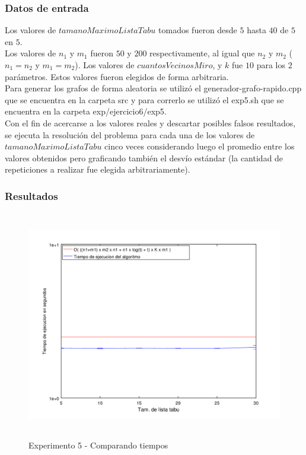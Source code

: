 \subsubsection*{Datos de entrada}\;
\noindent Los valores de $tamanoMaximoListaTabu$ tomados fueron desde $5$ hasta $40$ de $5$ en $5$. \\
       Los valores de $n_1$ y $m_1$ fueron $50$ y $200$ respectivamente, al igual que $n_2$ y $m_2$ ($n_1 = n_2$ y $m_1 = m_2$). Los valores de $cuantosVecinosMiro$, y $k$ fue $10$ para los $2$ parámetros. Estos valores fueron elegidos de forma arbitraria. \\
        Para generar los grafos de forma aleatoria se utilizó el generador-grafo-rapido.cpp que se encuentra en la carpeta src y para correrlo se utilizó el exp5.sh que se encuentra en la carpeta exp/ejercicio6/exp5. \\
        Con el fin de acercarse a los valores reales y descartar posibles falsos resultados, se ejecuta la resolución del problema para cada una de los valores de $tamanoMaximoListaTabu$ cinco veces considerando luego el promedio entre los valores obtenidos pero graficando también el desvío estándar (la cantidad de repeticiones a realizar fue elegida arbitrariamente).\; 

\subsubsection*{Resultados}\;
    \begin{figure}[H]
      \includegraphics[height=10cm]{graficos/ejercicio6-exp5-tiempos.png}
       \caption{Experimento 5 - Comparando tiempos}
	\end{figure}

